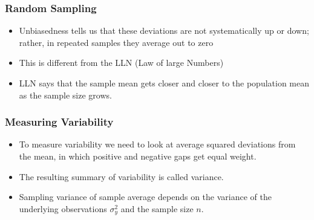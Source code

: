 \documentclass{beamer}
\begin{document}

\begin{frame}
\frametitle{Random Sampling}
\begin{itemize}
	\item Unbiasedness tells us that these deviations are not systematically up or down; rather, in repeated samples they average out to zero
	\item This is different from the LLN (Law of large Numbers)
	\item LLN says that the sample mean gets closer and closer to the population mean as the sample size grows.
\end{itemize}

\end{frame}


\begin{frame}
\frametitle{Measuring Variability}
\begin{itemize}
	\item To measure variability we need to look at average squared deviations from the
mean, in which positive and negative gaps get equal weight. 
	\item The resulting summary of variability is called variance.
	\item Sampling variance of sample average depends on the variance of the underlying observations $\sigma^2_y$ and the sample size $n$.
\end{itemize}


\end{frame}

\end{document}
